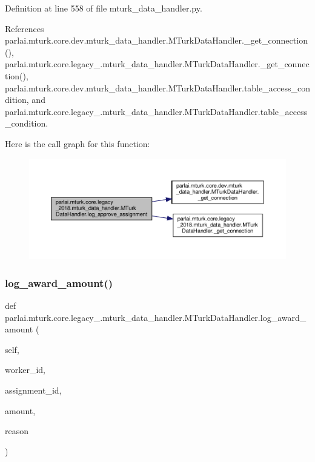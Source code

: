 Definition at line 558 of file mturk\+\_\+data\+\_\+handler.\+py.



References parlai.\+mturk.\+core.\+dev.\+mturk\+\_\+data\+\_\+handler.\+M\+Turk\+Data\+Handler.\+\_\+get\+\_\+connection(), parlai.\+mturk.\+core.\+legacy\+\_.\+mturk\+\_\+data\+\_\+handler.\+M\+Turk\+Data\+Handler.\+\_\+get\+\_\+connection(), parlai.\+mturk.\+core.\+dev.\+mturk\+\_\+data\+\_\+handler.\+M\+Turk\+Data\+Handler.\+table\+\_\+access\+\_\+condition, and parlai.\+mturk.\+core.\+legacy\+\_.\+mturk\+\_\+data\+\_\+handler.\+M\+Turk\+Data\+Handler.\+table\+\_\+access\+\_\+condition.

Here is the call graph for this function\+:
\nopagebreak
\begin{figure}[H]
\begin{center}
\leavevmode
\includegraphics[width=350pt]{classparlai_1_1mturk_1_1core_1_1legacy__2018_1_1mturk__data__handler_1_1MTurkDataHandler_ae56cf103d88b3fda36a51ffc0534c184_cgraph}
\end{center}
\end{figure}
\mbox{\label{classparlai_1_1mturk_1_1core_1_1legacy__2018_1_1mturk__data__handler_1_1MTurkDataHandler_aa6003d72e64397b5d7ad10018c9ab1ff}} 
\subsubsection{\texorpdfstring{log\+\_\+award\+\_\+amount()}{log\_award\_amount()}}
{\footnotesize\ttfamily def parlai.\+mturk.\+core.\+legacy\+\_.\+mturk\+\_\+data\+\_\+handler.\+M\+Turk\+Data\+Handler.\+log\+\_\+award\+\_\+amount (\begin{DoxyParamCaption}\item[{}]{self,  }\item[{}]{worker\+\_\+id,  }\item[{}]{assignment\+\_\+id,  }\item[{}]{amount,  }\item[{}]{reason }\end{DoxyParamCaption})}

